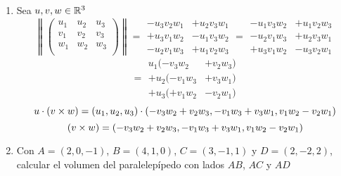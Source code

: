 \documentclass[../practica.root.tex]{subfiles}
\begin{document}
\begin{enumerate}
    \item Sea $u,v,w \in \mathbb{R}^3$
          \[
              \left\|
              \begin{pmatrix}
                  u_1 & u_2 & u_3 \\
                  v_1 & v_2 & v_3 \\
                  w_1 & w_2 & w_3 \\
              \end{pmatrix}
              \right\|
              =
              \begin{array}{rl}
                  -u_3 v_2 w_1  & + u_2 v_3 w_1 \\
                  + u_3 v_1 w_2 & - u_1 v_3 w_2 \\
                  - u_2 v_1 w_3 & + u_1 v_2 w_3
              \end{array}
              =
              \begin{array}{rl}
                  - u_1 v_3 w_2 & + u_1 v_2 w_3 \\
                  - u_2 v_1 w_3 & + u_2 v_3 w_1 \\
                  + u_3 v_1 w_2 & -u_3 v_2 w_1
              \end{array}
          \] \[
              =
              \begin{array}{rl}
                  u_1(- v_3 w_2   & + v_2 w_3) \\
                  + u_2(- v_1 w_3 & + v_3 w_1) \\
                  + u_3(+ v_1 w_2 & -v_2 w_1)
              \end{array}
          \] \[
              u \cdot (v \times w) = (u_1, u_2, u_3) \cdot (-v_3w_2+v_2w_3, -v_1w_3+v_3w_1, v_1w_2-v_2w_1)
          \] \[
              (v \times w) = (-v_3w_2+v_2w_3, -v_1w_3+v_3w_1, v_1w_2-v_2w_1)
          \]

    \item Con $A = (2, 0, -1)$, $B = (4, 1, 0)$, $C = (3, -1, 1)$ y $D = (2, -2, 2)$,
          calcular el volumen del paralelepípedo con lados $AB$, $AC$ y $AD$

\end{enumerate}
\end{document}
